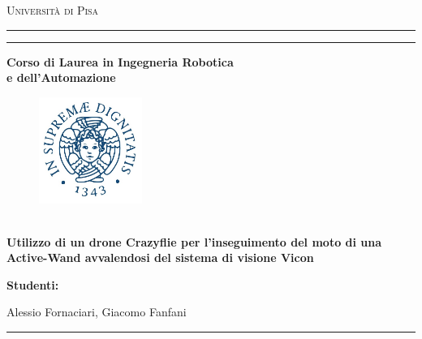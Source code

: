 \documentclass[a4paper,draft,titlepage]{report}
\begin{document}
	
\begin{titlepage}
\begin{center}
{{\LARGE{\textsc{Universit\`a  di Pisa}}}} 
\rule[0.1cm]{14.7cm}{0.1mm}
\rule[0.8cm]{14.7cm}{0.6mm}
{\large{\bf
Corso di Laurea in Ingegneria Robotica \\e dell'Automazione}}
\end{center}
\vspace{5mm}
 \begin{figure}[h]
	\centering
	\includegraphics[width=0.3\textwidth]{Immagini/unipi}	
\end{figure}

\begin{center}
{\LARGE{\bf {}}}\\
\vspace{20mm} {\Large{\bf Utilizzo di un drone Crazyflie per l'inseguimento del moto di una Active-Wand avvalendosi del sistema di visione Vicon}}
\end{center}
\vspace{10mm}
\par
\noindent
\begin{center}{\textwidth}
\vspace{12mm}
{\large{\bf \vspace{-5pt}Studenti:\\ }}
\end{center}

\begin{center}
{\large{\vspace{-5pt}Alessio Fornaciari, Giacomo Fanfani\\}}
\end{center}
\vspace{30mm}
\rule[0.1cm]{14.1cm}{0.1mm}

\hfill

\vspace{30mm}

\end{titlepage}

	\tableofcontents
\thispagestyle{empty}
\newpage

\setcounter{page}{1}










\end{document}
